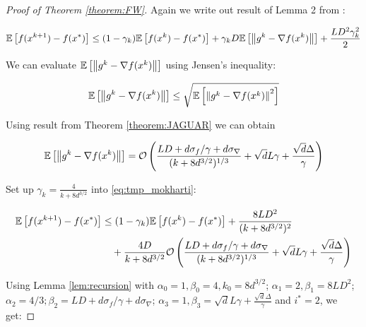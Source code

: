     \begin{proof}[Proof of Theorem \ref{theorem:FW}]
        Again we write out result of Lemma 2 from \cite{mokhtari2020stochastic}:

        \begin{equation}
        \label{eq:tmp_mokharti}
            \mathbb{E}\left[ f(x^{k+1}) - f(x^*) \right] \leq (1 - \gamma_k) \mathbb{E}\left[ f(x^{k}) - f(x^*) \right] + \gamma_k D \mathbb{E}\left[ \left\| g^k - \nabla f(x^k) \right\| \right] + \frac{L D^2 \gamma_k^2}{2}
        \end{equation}

        We can evaluate $\mathbb{E}\left[ \left\| g^k - \nabla f(x^k) \right\| \right]$ using Jensen’s inequality:

        \begin{equation*}
            \mathbb{E}\left[ \left\| g^k - \nabla f(x^k) \right\| \right] \leq \sqrt{\mathbb{E}\left[ \left\| g^k - \nabla f(x^k) \right\|^2 \right]}
        \end{equation*}

        Using result from Theorem \ref{theorem:JAGUAR} we can obtain

        \begin{equation*}
            \mathbb{E}\left[ \left\| g^k - \nabla f(x^k) \right\| \right] 
            = 
            \mathcal{O} \left(\frac{L D + d \sigma_f/ \gamma + d\sigma_{\nabla}}{(k + 8d^{3/2})^{1/3}} 
            +
            \sqrt{d} L \gamma + \frac{\sqrt{d} \Delta}{\gamma} \right)
        \end{equation*}

        Set up $\gamma_k = \frac{4}{k + 8d^{3/2}}$ into \eqref{eq:tmp_mokharti}:

        \begin{equation*}
        \begin{split}
            \mathbb{E}\left[ f(x^{k+1}) - f(x^*) \right] 
            &\leq 
            (1 - \gamma_k) \mathbb{E}\left[ f(x^{k}) - f(x^*) \right] 
            + \frac{8 L D^2}{(k + 8d^{3/2})^2}
            \\&\quad+
            \frac{4D}{k + 8d^{3/2}}  \mathcal{O} \left(\frac{L D + d \sigma_f/ \gamma + d\sigma_{\nabla}}{(k + 8d^{3/2})^{1/3}} 
            + \sqrt{d} L \gamma + \frac{\sqrt{d} \Delta}{\gamma} \right)
        \end{split}
        \end{equation*}

        Using Lemma \ref{lem:recursion} with $\alpha_0 = 1, \beta_0 = 4, k_0 = 8d^{3/2}$;
        $\alpha_1 = 2, \beta_1 = 8 L D^2$;
        $\alpha_2 = 4/3; \beta_2 = L D + d \sigma_f/ \gamma + d\sigma_{\nabla}$;
        $\alpha_3 = 1, \beta_3 = \sqrt{d} L \gamma + \frac{\sqrt{d} \Delta}{\gamma}$ and $i^* = 2$, we get:


\end{proof}
